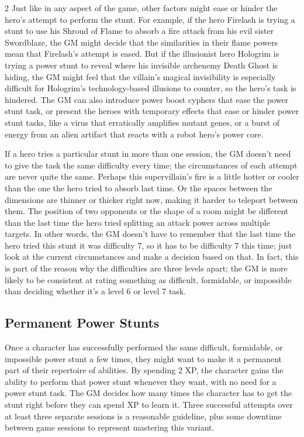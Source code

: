 \begin{multicols}{2}
Just like in any aspect of the game, other factors might ease or hinder the hero’s attempt to perform the stunt. For example, if the hero Firelash is trying a stunt to use his Shroud of Flame to absorb a fire attack from his evil sister Swordblaze, the GM might decide that the similarities in their flame powers mean that Firelash’s attempt is eased. But if the illusionist hero Hologrim is trying a power stunt to reveal where his invisible archenemy Death Ghost is hiding, the GM might feel that the villain’s magical invisibility is especially difficult for Hologrim’s technology-based illusions to counter, so the hero’s task is hindered. The GM can also introduce power boost cyphers that ease the power stunt task, or present the heroes with temporary effects that ease or hinder power stunt tasks, like a virus that erratically amplifies mutant genes, or a burst of energy from an alien artifact that reacts with a robot hero’s power core.

If a hero tries a particular stunt in more than one session, the GM doesn’t need to give the task the same difficulty every time; the circumstances of each attempt are never quite the same. Perhaps this supervillain’s fire is a little hotter or cooler than the one the hero tried to absorb last time. Or the spaces between the dimensions are thinner or thicker right now, making it harder to teleport between them. The position of two opponents or the shape of a room might be different than the last time the hero tried splitting an attack power across multiple targets. In other words, the GM doesn’t have to remember that the last time the hero tried this stunt it was difficulty 7, so it has to be difficulty 7 this time; just look at the current circumstances and make a decision based on that. In fact, this is part of the reason why the difficulties are three levels apart; the GM is more likely to be consistent at rating something as difficult, formidable, or impossible than deciding whether it’s a level 6 or level 7 task.

\subsection{Permanent Power Stunts}

Once a character has successfully performed the same difficult, formidable, or impossible power stunt a few times, they might want to make it a permanent part of their repertoire of abilities. By spending 2 XP, the character gains the ability to perform that power stunt whenever they want, with no need for a power stunt task. The GM decides how many times the character has to get the stunt right before they can spend XP to learn it. Three successful attempts over at least three separate sessions is a reasonable guideline, plus some downtime between game sessions to represent mastering this variant.


\end{multicols}
